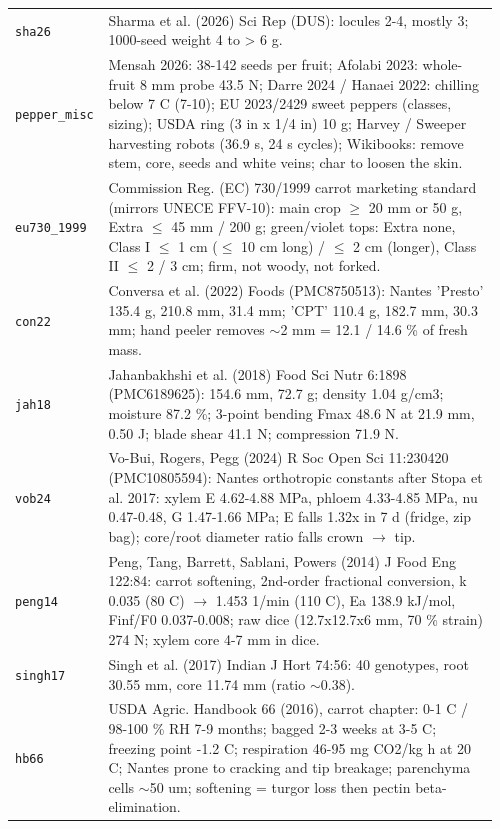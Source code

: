 \documentclass[10.5pt,a4paper]{article}
\begin{document}
{\begin{longtable}{@{}p{0.16\linewidth}p{0.8\linewidth}@{}}
\texttt{sha26} & Sharma et al. (2026) Sci Rep (DUS): locules 2-4, mostly 3; 1000-seed weight 4 to > 6 g. \\
\texttt{pepper\_\allowbreak{}misc} & Mensah 2026: 38-142 seeds per fruit; Afolabi 2023: whole-fruit 8 mm probe 43.5 N; Darre 2024 / Hanaei 2022: chilling below 7 C (7-10); EU 2023/2429 sweet peppers (classes, sizing); USDA ring (3 in x 1/4 in) 10 g; Harvey / Sweeper harvesting robots (36.9 s, 24 s cycles); Wikibooks: remove stem, core, seeds and white veins; char to loosen the skin. \\
\texttt{eu730\_\allowbreak{}1999} & Commission Reg. (EC) 730/1999 carrot marketing standard (mirrors UNECE FFV-10): main crop $\ge$ 20 mm or 50 g, Extra $\le$ 45 mm / 200 g; green/violet tops: Extra none, Class I $\le$ 1 cm ($\le$ 10 cm long) / $\le$ 2 cm (longer), Class II $\le$ 2 / 3 cm; firm, not woody, not forked. \\
\texttt{con22} & Conversa et al. (2022) Foods (PMC8750513): Nantes 'Presto' 135.4 g, 210.8 mm, 31.4 mm; 'CPT' 110.4 g, 182.7 mm, 30.3 mm; hand peeler removes $\sim$2 mm = 12.1 / 14.6 \% of fresh mass. \\
\texttt{jah18} & Jahanbakhshi et al. (2018) Food Sci Nutr 6:1898 (PMC6189625): 154.6 mm, 72.7 g; density 1.04 g/cm3; moisture 87.2 \%; 3-point bending Fmax 48.6 N at 21.9 mm, 0.50 J; blade shear 41.1 N; compression 71.9 N. \\
\texttt{vob24} & Vo-Bui, Rogers, Pegg (2024) R Soc Open Sci 11:230420 (PMC10805594): Nantes orthotropic constants after Stopa et al. 2017: xylem E 4.62-4.88 MPa, phloem 4.33-4.85 MPa, nu 0.47-0.48, G 1.47-1.66 MPa; E falls 1.32x in 7 d (fridge, zip bag); core/root diameter ratio falls crown $\to$ tip. \\
\texttt{peng14} & Peng, Tang, Barrett, Sablani, Powers (2014) J Food Eng 122:84: carrot softening, 2nd-order fractional conversion, k 0.035 (80 C) $\to$ 1.453 1/min (110 C), Ea 138.9 kJ/mol, Finf/F0 0.037-0.008; raw dice (12.7x12.7x6 mm, 70 \% strain) 274 N; xylem core 4-7 mm in dice. \\
\texttt{singh17} & Singh et al. (2017) Indian J Hort 74:56: 40 genotypes, root 30.55 mm, core 11.74 mm (ratio $\sim$0.38). \\
\texttt{hb66} & USDA Agric. Handbook 66 (2016), carrot chapter: 0-1 C / 98-100 \% RH 7-9 months; bagged 2-3 weeks at 3-5 C; freezing point -1.2 C; respiration 46-95 mg CO2/kg h at 20 C; Nantes prone to cracking and tip breakage; parenchyma cells $\sim$50 um; softening = turgor loss then pectin beta-elimination. \\

\end{longtable}}
\end{document}
